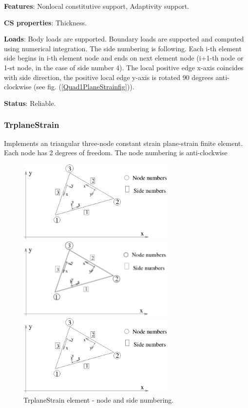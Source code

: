\documentclass[a4paper]{article}
\newcommand{\descitem}[1]{{\noindent \bf #1}:}
\begin{document}
\descitem{Features} Nonlocal constitutive support, Adaptivity support.

\descitem{CS properties} Thickness. 

\descitem{Loads} Body loads are supported. Boundary loads are
supported and computed using numerical integration. The side numbering is
following. Each i-th element side begins in i-th element node and
ends on next element node (i+1-th node or 1-st node, in the case of 
side number 4). The local positive edge x-axis coincides with side
direction, the positive local edge y-axis is rotated 90 degrees
anti-clockwise (see fig. (\ref{Quad1PlaneStrainfig})).

\descitem{Status} Reliable.


\subsubsection{TrplaneStrain}
Implements an triangular three-node  constant strain plane-strain  
finite element. Each node has 2 degrees of freedom.
The node numbering is anti-clockwise

\begin{figure}[htb]
\begin{htmlonly}
  \centerline{\includegraphics[width=0.7\textwidth]{trplanstrain.eps}}
\end{htmlonly}
\ifpdf
\centerline{\includegraphics[width=0.7\textwidth]{trplanstrain.pdf}}
\else
\centerline{\includegraphics[width=0.7\textwidth]{trplanstrain.eps}}
\fi
\caption{TrplaneStrain element - node and side numbering.}
\label{TrplaneStrain}
\end{figure}
\end{document}
